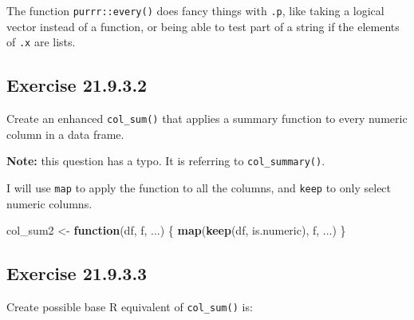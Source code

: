 \documentclass[]{book}
\newenvironment{Shaded}{\begin{snugshade}}{\end{snugshade}}
\newcommand{\CommentTok}[1]{\textcolor[rgb]{0.56,0.35,0.01}{\textit{#1}}}
\newcommand{\ControlFlowTok}[1]{\textcolor[rgb]{0.13,0.29,0.53}{\textbf{#1}}}
\newcommand{\KeywordTok}[1]{\textcolor[rgb]{0.13,0.29,0.53}{\textbf{#1}}}
\newcommand{\NormalTok}[1]{#1}
\newcommand{\StringTok}[1]{\textcolor[rgb]{0.31,0.60,0.02}{#1}}
\theoremstyle{plain}
\theoremstyle{remark}
\begin{document}
The function \texttt{purrr::every()} does fancy things with \texttt{.p},
like taking a logical vector instead of a function, or being able to
test part of a string if the elements of \texttt{.x} are lists.

\hypertarget{exercise-21.9.3.2}{%
\subsection*{\texorpdfstring{Exercise
{21.9.3.2}}{Exercise 21.9.3.2}}\label{exercise-21.9.3.2}}

Create an enhanced \texttt{col\_sum()} that applies a summary function
to every numeric column in a data frame.

\textbf{Note:} this question has a typo. It is referring to
\texttt{col\_summary()}.

I will use \texttt{map} to apply the function to all the columns, and
\texttt{keep} to only select numeric columns.

\begin{Shaded}
\begin{Highlighting}[]
\NormalTok{col_sum2 <-}\StringTok{ }\ControlFlowTok{function}\NormalTok{(df, f, ...) \{}
  \KeywordTok{map}\NormalTok{(}\KeywordTok{keep}\NormalTok{(df, is.numeric), f, ...)}
\NormalTok{\}}
\end{Highlighting}
\end{Shaded}

\begin{Shaded}
\end{Shaded}

\hypertarget{exercise-21.9.3.3}{%
\subsection*{\texorpdfstring{Exercise
{21.9.3.3}}{Exercise 21.9.3.3}}\label{exercise-21.9.3.3}}

Create possible base R equivalent of \texttt{col\_sum()} is:
\end{document}
